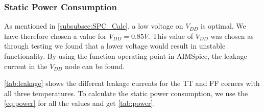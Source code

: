 \subsubsection{Static Power Consumption}

As mentioned in \autoref{subsubsec:SPC_Calc}, a low voltage on $V_{DD}$ is optimal. We have therefore chosen a value for $V_{DD} = 0.85V$. This value of $V_{DD}$ was chosen as through testing we found that a lower voltage would result in unstable functionality. By using the function operating point in AIMSpice, the leakage current in the $V_{DD}$ node can be found.

\autoref{tab:leakage} shows the different leakage currents for the TT and FF corners with all three temperatures. To calculate the static power consumption, we use the \autoref{eq:power} for all the values and get  \autoref{tab:power}.

\begin{table}[H]
\centering
\caption{Leakage Current.}
\label{tab:leakage}
\end{table}

\begin{table}[H]
\centering
\caption{Static Power Consumption.}
\label{tab:power}
\end{table}

